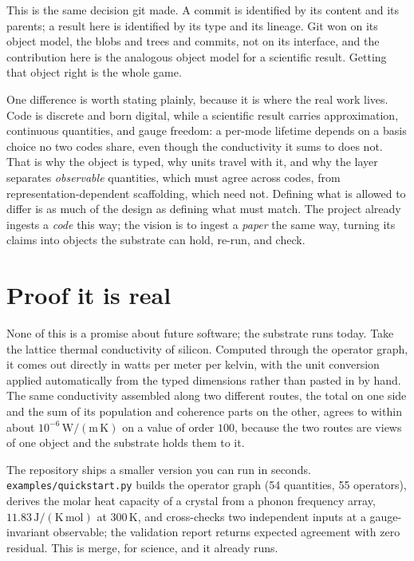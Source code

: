 \documentclass[11pt,a4paper]{article}
\begin{document}
This is the same decision git made. A commit is identified by its content and its
parents; a result here is identified by its type and its lineage. Git won on its
object model, the blobs and trees and commits, not on its interface, and the
contribution here is the analogous object model for a scientific result. Getting
that object right is the whole game.

One difference is worth stating plainly, because it is where the real work lives.
Code is discrete and born digital, while a scientific result carries approximation,
continuous quantities, and gauge freedom: a per-mode lifetime depends on a basis
choice no two codes share, even though the conductivity it sums to does not. That
is why the object is typed, why units travel with it, and why the layer separates
\emph{observable} quantities, which must agree across codes, from
representation-dependent scaffolding, which need not. Defining what is allowed to
differ is as much of the design as defining what must match. The project already
ingests a \emph{code} this way; the vision is to ingest a \emph{paper} the same
way, turning its claims into objects the substrate can hold, re-run, and check.

\section{Proof it is real}

None of this is a promise about future software; the substrate runs today. Take
the lattice thermal conductivity of silicon. Computed through the operator graph,
it comes out directly in watts per meter per kelvin, with the unit conversion
applied automatically from the typed dimensions rather than pasted in by hand. The
same conductivity assembled along two different routes, the total on one side and
the sum of its population and coherence parts on the other, agrees to within about
$10^{-6}\,\mathrm{W/(m\,K)}$ on a value of order $100$, because the two routes are
views of one object and the substrate holds them to it.

The repository ships a smaller version you can run in seconds.
\texttt{examples/quickstart.py} builds the operator graph (54 quantities, 55
operators), derives the molar heat capacity of a crystal from a phonon frequency
array, $11.83\,\mathrm{J/(K\,mol)}$ at $300\,\mathrm{K}$, and cross-checks two
independent inputs at a gauge-invariant observable; the validation report returns
expected agreement with zero residual. This is merge, for science, and it already
runs.
\end{document}
